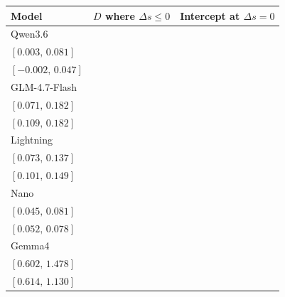 \begingroup
\fontsize{10}{11.5}\selectfont
\setlength{\tabcolsep}{3pt}
\renewcommand{\arraystretch}{1.08}
\begin{tabular*}{\linewidth}{@{\extracolsep{\fill}}lcc@{}}
\toprule
Model & $D$ where $\Delta s\leq 0$ & Intercept at $\Delta s=0$ \\
\midrule
Qwen3.6 & \begin{tabular}[t]{@{}c@{}}\(0.038\)\\\([0.003,\,0.081]\)\end{tabular} & \begin{tabular}[t]{@{}c@{}}\(0.021\)\\\([-0.002,\,0.047]\)\end{tabular}\\[2pt]
GLM-4.7-Flash & \begin{tabular}[t]{@{}c@{}}\(0.124\)\\\([0.071,\,0.182]\)\end{tabular} & \begin{tabular}[t]{@{}c@{}}\(0.145\)\\\([0.109,\,0.182]\)\end{tabular}\\[2pt]
Lightning & \begin{tabular}[t]{@{}c@{}}\(0.104\)\\\([0.073,\,0.137]\)\end{tabular} & \begin{tabular}[t]{@{}c@{}}\(0.125\)\\\([0.101,\,0.149]\)\end{tabular}\\[2pt]
Nano & \begin{tabular}[t]{@{}c@{}}\(0.062\)\\\([0.045,\,0.081]\)\end{tabular} & \begin{tabular}[t]{@{}c@{}}\(0.065\)\\\([0.052,\,0.078]\)\end{tabular}\\[2pt]
Gemma4 & \begin{tabular}[t]{@{}c@{}}\(1.024\)\\\([0.602,\,1.478]\)\end{tabular} & \begin{tabular}[t]{@{}c@{}}\(0.864\)\\\([0.614,\,1.130]\)\end{tabular}\\[2pt]

\end{tabular*}
